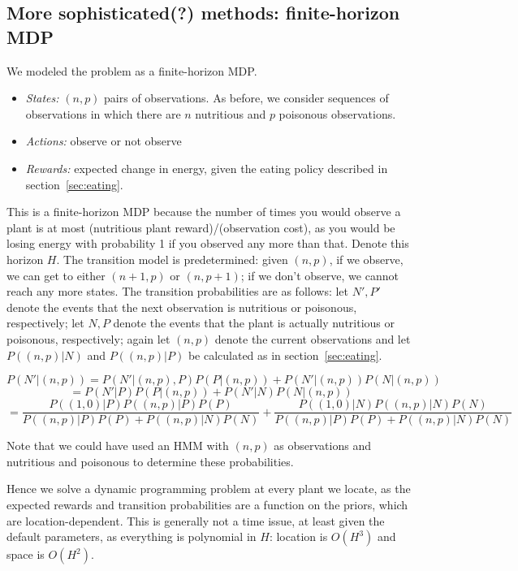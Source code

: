 \documentclass{article}
\begin{document}
\subsection{More sophisticated(?) methods: finite-horizon MDP}
We modeled the problem as a finite-horizon MDP.
\begin{itemize}
\item \emph{States:} $(n,p)$ pairs of observations. As before, we consider
  sequences of observations in which there are $n$ nutritious and $p$
  poisonous observations. 
\item \emph{Actions:} observe or not observe
\item \emph{Rewards:} expected change in energy, given the eating policy
  described in section~\ref{sec:eating}. 
\end{itemize}
This is a finite-horizon MDP because the number of times you would
observe a plant is at most (nutritious plant reward)/(observation cost),
as you would be losing energy with probability 1 if you observed any more
than that. Denote this horizon $H$.
The transition model is predetermined: given $(n,p)$, if we observe,
we can get to either $(n+1,p)$ or $(n,p+1)$; if we don't observe, we
cannot reach any more states. 
The transition probabilities are as follows:
let $N',P'$ denote the events that the next observation is nutritious or poisonous,
respectively; let $N,P$ denote the events that the plant is actually nutritious
or poisonous, respectively; again let $(n,p)$ denote the current observations
and let $P((n,p)|N)$ and $P((n,p)|P)$ be calculated as in section~\ref{sec:eating}.

$$P(N'|(n,p))=P(N'|(n,p),P)P(P|(n,p))+P(N'|(n,p))P(N|(n,p))$$
$$=P(N'|P)P(P|(n,p))+P(N'|N)P(N|(n,p))$$
$$=\frac{P((1,0)|P)P((n,p)|P)P(P)}{P((n,p)|P)P(P)+P((n,p)|N)P(N)} + \frac{P((1,0)|N)P((n,p)|N)P(N)}{P((n,p)|P)P(P)+P((n,p)|N)P(N)}$$

Note that we could have used an HMM with $(n,p)$ as observations 
and nutritious and poisonous to determine these probabilities. 

Hence we solve a dynamic programming problem at every plant we locate,
as the expected rewards and transition probabilities are a function on
the priors, which are location-dependent. This is generally not a time issue,
at least given the default parameters, 
as everything is polynomial in $H$: location is $O(H^3)$ and space is $O(H^2)$. 

\end{document}

